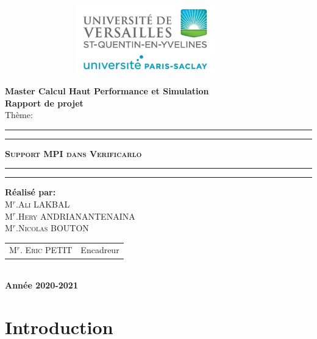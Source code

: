 \documentclass[a4paper,11pt]{report}
\begin{document}
\begin{center}
\begin{figure}[!htbp]
\begin{center}
\includegraphics[width=10cm,height=3cm]{../ressources/a.jpeg}
\end{center}
\end{figure}


{\Large {\bf { Master Calcul Haut Performance et Simulation }}}\\
 \textbf{\Huge { Rapport de projet}} \\
{\huge {Thème:}}\\
\hrule
\hrule
{}
{\huge \textbf{\textsc{ Support MPI dans Verificarlo}}}\\
\hrule
\hrule
{}
{\textbf{\Large{Réalisé par:}}}\\
{\large\textsc{M$^{r}$.Ali LAKBAL}}\\
{\large\textsc{M$^{r}$.Hery ANDRIANANTENAINA}}\\
{\large\textsc{M$^{r}$.Nicolas BOUTON}}\\
{\large
\begin{tabular}{ll}
M$^{r}$. \textsc{Eric} PETIT  & Encadreur    \\
\end{tabular}
}\\
{\Large\textbf{ Année 2020-2021}}
\end{center}

\tableofcontents

\chapter*{Introduction}
\end{document}
